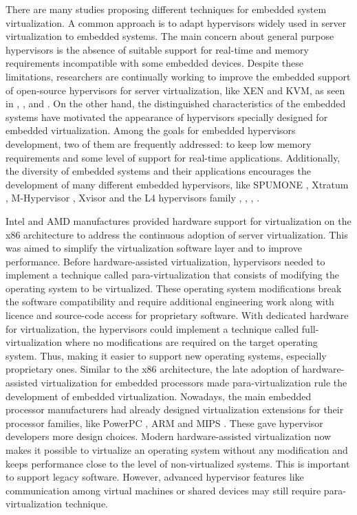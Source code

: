 There are many studies proposing different techniques for embedded system virtualization. A common approach is to adapt hypervisors widely used in server virtualization to embedded systems. The main concern about general purpose hypervisors is the absence of suitable support for real-time and memory requirements incompatible with some embedded devices. Despite these limitations, researchers are continually working to improve the embedded support of open-source hypervisors for server virtualization, like XEN and KVM, as seen in \cite{Dall2014}, \cite{Dan2015}, \cite{seehwan2014} and \cite{avanzini2015}. On the other hand, the distinguished characteristics of the embedded systems have motivated the appearance of hypervisors specially designed for embedded virtualization. Among the goals for embedded hypervisors development, two of them are frequently addressed: to keep low memory requirements and some level of support for real-time applications. Additionally, the diversity of embedded systems and their applications encourages the development of many different embedded hypervisors, like SPUMONE \cite{spumone2008}, Xtratum \cite{trujillo2013}, M-Hypervisor \cite{rui2013}, Xvisor \cite{patel2015} and the L4 hypervisors family \cite{Xia2015}, \cite{Heiser2010}, \cite{pikeos}, \cite{yang2011}.

Intel and AMD manufactures provided hardware support for virtualization on the x86 architecture to address the continuous adoption of server virtualization. This was aimed  to simplify the virtualization software layer and to improve performance. Before hardware-assisted virtualization, hypervisors needed to implement a technique called para-virtualization that consists of modifying the operating system to be virtualized. These operating system modifications break the software compatibility and require additional engineering work along with licence and source-code access for proprietary software. With dedicated hardware for virtualization, the hypervisors could implement a technique called full-virtualization where no modifications are required on the target operating system. Thus, making it easier to support new operating systems, especially proprietary ones. Similar to the x86 architecture, the late adoption of hardware-assisted virtualization for embedded processors made para-virtualization rule the development of embedded virtualization. Nowadays, the main embedded processor manufacturers had already designed virtualization extensions for their processor families, like PowerPC \cite{powerpcvz}, ARM \cite{armvt} and MIPS \cite{mipsvz}. These gave hypervisor developers more design choices. Modern hardware-assisted virtualization now makes it possible to virtualize an operating system without any modification and keeps performance close to the level of non-virtualized systems. This is important to support legacy software. However, advanced hypervisor features like communication among virtual machines or shared devices may still require para-virtualization technique. 

